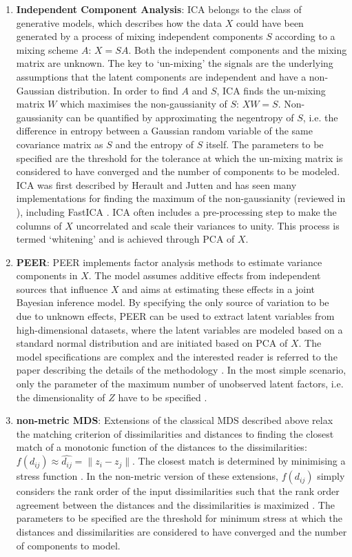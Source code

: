 \begin{enumerate}
\item\textbf{Independent Component Analysis}:  ICA belongs to the class of generative models, which describes how the data \(X\) could have been generated by a process of mixing independent components \(S\) according to a mixing scheme \(A\): \(X = SA\). Both the independent components and the mixing matrix are unknown. The key to `un-mixing' the signals are the underlying assumptions that the latent components are independent and have a non-Gaussian distribution. In order to find \(A\) and \(S\), ICA finds the un-mixing matrix \(W\) which maximises the non-gaussianity of \(S\): \(XW=S\). Non-gaussianity can be quantified by approximating the negentropy of \(S\), i.e. the difference in entropy between a Gaussian random variable of the same covariance matrix as \(S\) and the entropy of \(S\) itself. The parameters to be specified are the threshold for the tolerance at which the un-mixing matrix is considered to have converged and the number of components to be modeled.  ICA was first described by Herault and Jutten \citeyear{Herault1983} and has seen many implementations for finding the maximum of the non-gaussianity (reviewed in \citep{Common1994}), including FastICA \citep{Hyvarinen2000}. ICA often includes a pre-processing step to make the columns of \(X\) uncorrelated and scale their variances to unity. This process is termed  `whitening' and is achieved through PCA of \(X\). 

\item\textbf{PEER}: PEER implements factor analysis methods to estimate variance components in \(X\). The model assumes additive effects from independent sources that influence \(X\) and aims at estimating these effects in a joint Bayesian inference model.  By specifying the only source of variation to be due to unknown effects, PEER can be used to extract latent variables from high-dimensional datasets, where the latent variables are modeled based on a standard normal distribution and are initiated based on PCA of \(X\). The model specifications are complex and the interested reader is referred to the paper describing the details of the methodology \citep{Stegle2010}. In the most simple scenario, only the parameter of the maximum number of unobserved latent factors, i.e. the dimensionality of \(Z\) have to be specified \citep{Stegle2012}. 

\item\textbf{non-metric MDS}: Extensions of the classical MDS described above relax the matching criterion of dissimilarities and distances to finding the closest match of a monotonic function of the distances to the dissimilarities: \(f(d_{ij}) \approx \hat{d_{ij}} = \lVert z_i - z_j\rVert \). The closest match is determined by minimising a stress function \citep{Kruskal1964a,Kruskal1964b}. In the non-metric version of these extensions, \(f(d_{ij})\) simply considers the rank order of the input dissimilarities such that the rank order agreement between the distances and the dissimilarities is maximized \citep{Minchin1987}. The parameters to be specified are the threshold for minimum stress at which the distances and dissimilarities are considered to have converged and the number of components to model.


\end{enumerate}
